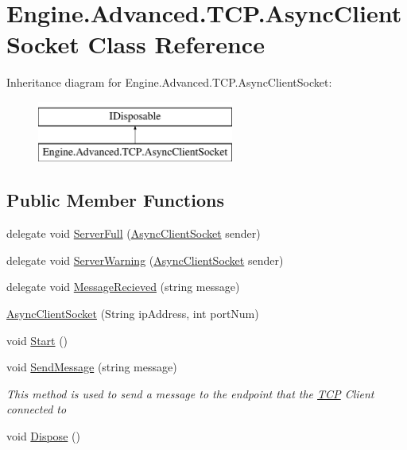 \hypertarget{class_engine_1_1_advanced_1_1_t_c_p_1_1_async_client_socket}{}\section{Engine.\+Advanced.\+T\+C\+P.\+Async\+Client\+Socket Class Reference}
\label{class_engine_1_1_advanced_1_1_t_c_p_1_1_async_client_socket}
Inheritance diagram for Engine.\+Advanced.\+T\+C\+P.\+Async\+Client\+Socket\+:\begin{figure}[H]
\begin{center}
\leavevmode
\includegraphics[height=2.000000cm]{class_engine_1_1_advanced_1_1_t_c_p_1_1_async_client_socket}
\end{center}
\end{figure}
\subsection*{Public Member Functions}
\begin{DoxyCompactItemize}
\item 
delegate void \mbox{\hyperlink{class_engine_1_1_advanced_1_1_t_c_p_1_1_async_client_socket_a992805398f43802c511b8f40a9344254}{Server\+Full}} (\mbox{\hyperlink{class_engine_1_1_advanced_1_1_t_c_p_1_1_async_client_socket}{Async\+Client\+Socket}} sender)
\item 
delegate void \mbox{\hyperlink{class_engine_1_1_advanced_1_1_t_c_p_1_1_async_client_socket_a519c68733927ee8465d4d38726c137f8}{Server\+Warning}} (\mbox{\hyperlink{class_engine_1_1_advanced_1_1_t_c_p_1_1_async_client_socket}{Async\+Client\+Socket}} sender)
\item 
delegate void \mbox{\hyperlink{class_engine_1_1_advanced_1_1_t_c_p_1_1_async_client_socket_a901d0df6f647e9d477a6d46be0865662}{Message\+Recieved}} (string message)
\item 
\mbox{\hyperlink{class_engine_1_1_advanced_1_1_t_c_p_1_1_async_client_socket_aa9ea42a5946a7ac0853912e49c82413b}{Async\+Client\+Socket}} (String ip\+Address, int port\+Num)
\item 
void \mbox{\hyperlink{class_engine_1_1_advanced_1_1_t_c_p_1_1_async_client_socket_a5702213267e4cad42c5a6a5d469f2266}{Start}} ()
\item 
void \mbox{\hyperlink{class_engine_1_1_advanced_1_1_t_c_p_1_1_async_client_socket_afb71eb2cfe57d21655b652b90246efa6}{Send\+Message}} (string message)
\begin{DoxyCompactList}\small\item\em This method is used to send a message to the endpoint that the \mbox{\hyperlink{namespace_engine_1_1_advanced_1_1_t_c_p}{T\+CP}} Client connected to \end{DoxyCompactList}\item 
void \mbox{\hyperlink{class_engine_1_1_advanced_1_1_t_c_p_1_1_async_client_socket_a26433cb5dcf09422a198135d8982f67a}{Dispose}} ()
\end{DoxyCompactItemize}
